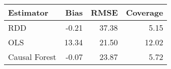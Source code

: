 \begin{table}[ht]
\centering
\begin{tabular}{lrrr}
  \hline
Estimator & Bias & RMSE & Coverage \\ 
  \hline
RDD & -0.21 & 37.38 & 5.15 \\ 
  OLS & 13.34 & 21.50 & 12.02 \\ 
  Causal Forest & -0.07 & 23.87 & 5.72 \\ 
   \hline
\end{tabular}
\end{table}
